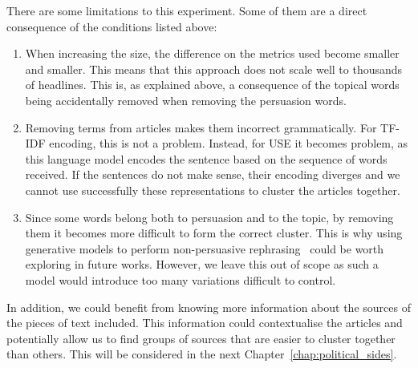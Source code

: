 
There are some limitations to this experiment. Some of them are a direct consequence of the conditions listed above:

\begin{enumerate}
    \item When increasing the size, the difference on the metrics used become smaller and smaller. This means that this approach does not scale well to thousands of headlines. This is, as explained above, a consequence of the topical words being accidentally removed when removing the persuasion words.
    \item Removing terms from articles makes them incorrect grammatically. For TF-IDF encoding, this is not a problem. Instead, for USE it becomes problem, as this language model encodes the sentence based on the sequence of words received. If the sentences do not make sense, their encoding diverges and we cannot use successfully these representations to cluster the articles together.
    \item Since some words belong both to persuasion and to the topic, by removing them it becomes more difficult to form the correct cluster.
    This is why using generative models to perform non-persuasive rephrasing~\cite{bagdasaryan2022spinning} could be worth exploring in future works. However, we leave this out of scope as such a model would introduce too many variations difficult to control. %
\end{enumerate}

In addition, we could benefit from knowing more information about the sources of the pieces of text included. This information could contextualise the articles and potentially allow us to find groups of sources that are easier to cluster together than others. This will be considered in the next Chapter~\ref{chap:political_sides}.

